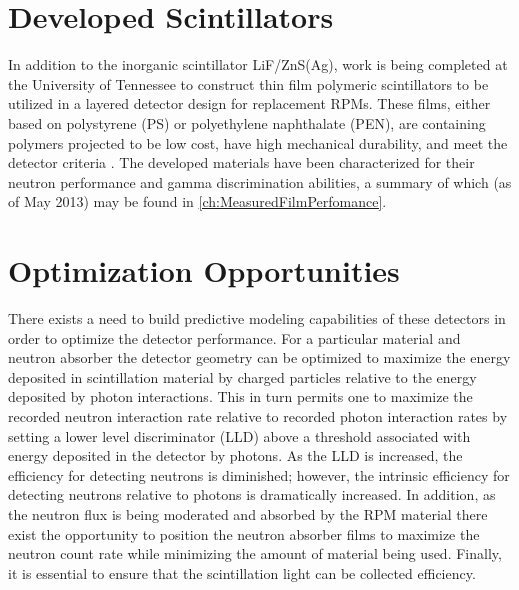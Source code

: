 \section{Developed Scintillators}
\label{sec:DevelopedScintillators}
In addition to the inorganic scintillator LiF/ZnS(Ag), work is being completed at the University of Tennessee to construct thin film polymeric scintillators to be utilized in a layered detector design for replacement RPMs.
These films, either based on polystyrene (PS) or polyethylene naphthalate (PEN), are  containing polymers projected to be low cost, have high mechanical durability, and meet the detector criteria \cite{Sen_Composites,Mabe201329}.
The developed materials have been characterized for their neutron performance and gamma discrimination abilities, a summary of which (as of May 2013) may be found in \autoref{ch:MeasuredFilmPerfomance}.
\section{Optimization Opportunities}
There exists a need to build predictive modeling capabilities of these detectors in order to optimize the detector performance.
For a particular material and neutron absorber the detector geometry can be optimized to maximize the energy deposited in scintillation material by charged particles relative to the energy deposited by photon interactions. 
This in turn permits one to maximize the recorded neutron interaction rate relative to recorded photon interaction rates by setting a lower level discriminator (LLD) above a threshold associated with energy deposited in the detector by photons.  
As the LLD is increased, the efficiency for detecting neutrons is diminished; however, the intrinsic efficiency for detecting neutrons relative to photons is dramatically increased. 
In addition, as the neutron flux is being moderated and absorbed by the RPM material there exist the opportunity to position the neutron absorber films to maximize the neutron count rate while minimizing the amount of material being used.
Finally, it is essential to ensure that the scintillation light can be collected efficiency.

